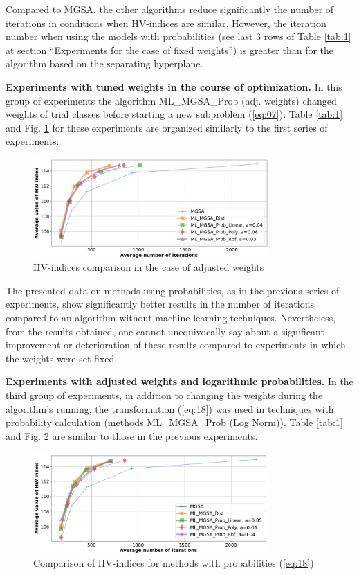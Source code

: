\documentclass[runningheads]{llncs}
\begin{document}
Compared to MGSA, the other algorithms reduce significantly the number of iterations in conditions when HV-indices are similar. However, the iteration number when using the models with probabilities (see last 3 rows of Table \ref{tab:1} at section ``Experiments for the case of fixed weights'') is greater than for the algorithm based on the separating hyperplane.

\textbf{Experiments with tuned weights in the course of optimization.} In this group of experiments the algorithm ML\_MGSA\_Prob (adj. weights) changed weights of trial classes before starting a new subproblem (\ref{eq:07}). Table \ref{tab:1} and Fig. \ref{fig:4} for these experiments are organized similarly to the first series of experiments.

\begin{figure}
\centering
\includegraphics[width=0.8\textwidth]{fig4.png}
\caption{HV-indices comparison  in the case of adjusted weights} 
\label{fig:4}
\end{figure}

The presented data on methods using probabilities, as in the previous series of experiments, show significantly better results in the number of iterations compared to an algorithm without machine learning techniques. Nevertheless, from the results obtained, one cannot unequivocally say about a significant improvement or deterioration of these results compared to experiments in which the weights were set fixed.

\textbf{Experiments with adjusted weights and logarithmic probabilities.} In the third group of experiments, in addition to changing the weights during the algorithm’s running, the transformation (\ref{eq:18}) was used in techniques with probability calculation (methods ML\_MGSA\_Prob (Log Norm)). Table \ref{tab:1} and Fig. \ref{fig:5} are similar to those in the previous experiments.

\begin{figure}
\centering
\includegraphics[width=0.8\textwidth]{fig5.png}
\caption{Comparison of  HV-indices for methods with probabilities (\ref{eq:18})} 
\label{fig:5}
\end{figure}
\end{document}
